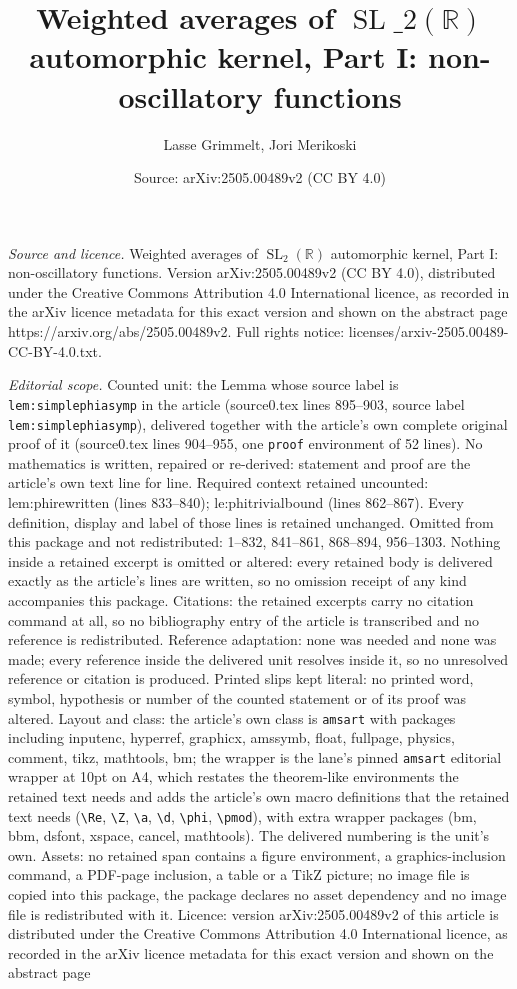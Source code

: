 \documentclass[10pt,a4paper]{amsart}
\title[Weighted averages of $\operatorname{SL}\_2(\mathbb{R})$ autom]{Weighted averages of $\operatorname{SL}\_2(\mathbb{R})$ automorphic kernel, Part I: non-oscillatory functions}
\author{Lasse Grimmelt, Jori Merikoski}
\date{Source: arXiv:2505.00489v2 (CC BY 4.0)}
\begin{document}
\maketitle

\noindent\emph{Source and licence.} Weighted averages of $\operatorname{SL}_2(\mathbb{R})$ automorphic kernel, Part I: non-oscillatory functions. Version arXiv:2505.00489v2 (CC BY 4.0), distributed under the Creative Commons Attribution 4.0 International licence, as recorded in the arXiv licence metadata for this exact version and shown on the abstract page https://arxiv.org/abs/2505.00489v2. Full rights notice: licenses/arxiv-2505.00489-CC-BY-4.0.txt.\par\smallskip

\noindent\textit{Editorial scope.} Counted unit: the Lemma whose source label is \texttt{lem:simplephiasymp} in the article (source0.tex lines 895--903, source label \texttt{lem:simplephiasymp}), delivered together with the article's own complete original proof of it (source0.tex lines 904--955, one \texttt{proof} environment of 52 lines). No mathematics is written, repaired or re-derived: statement and proof are the article's own text line for line. Required context retained uncounted: lem:phirewritten (lines 833--840); le:phitrivialbound (lines 862--867). Every definition, display and label of those lines is retained unchanged. Omitted from this package and not redistributed: 1--832, 841--861, 868--894, 956--1303. Nothing inside a retained excerpt is omitted or altered: every retained body is delivered exactly as the article's lines are written, so no omission receipt of any kind accompanies this package. Citations: the retained excerpts carry no citation command at all, so no bibliography entry of the article is transcribed and no reference is redistributed. Reference adaptation: none was needed and none was made; every reference inside the delivered unit resolves inside it, so no unresolved reference or citation is produced. Printed slips kept literal: no printed word, symbol, hypothesis or number of the counted statement or of its proof was altered. Layout and class: the article's own class is \texttt{amsart} with packages including inputenc, hyperref, graphicx, amssymb, float, fullpage, physics, comment, tikz, mathtools, bm; the wrapper is the lane's pinned \texttt{amsart} editorial wrapper at 10pt on A4, which restates the theorem-like environments the retained text needs and adds the article's own macro definitions that the retained text needs (\texttt{\textbackslash Re}, \texttt{\textbackslash Z}, \texttt{\textbackslash a}, \texttt{\textbackslash d}, \texttt{\textbackslash phi}, \texttt{\textbackslash pmod}), with extra wrapper packages (bm, bbm, dsfont, xspace, cancel, mathtools). The delivered numbering is the unit's own. Assets: no retained span contains a figure environment, a graphics-inclusion command, a PDF-page inclusion, a table or a TikZ picture; no image file is copied into this package, the package declares no asset dependency and no image file is redistributed with it. Licence: version arXiv:2505.00489v2 of this article is distributed under the Creative Commons Attribution 4.0 International licence, as recorded in the arXiv licence metadata for this exact version and shown on the abstract page 
\end{document}

